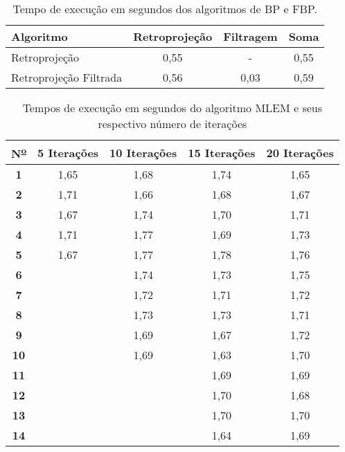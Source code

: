 \begin{table}[H]
	\footnotesize
	\centering
	\caption{Tempo de execução em segundos dos algoritmos de \acs{BP} e \acs{FBP}.}
	\label{tab:tabCap5Tempos1}
	\begin{tabular}{l|c|c|c}
		\textbf{Algoritmo}	    & \textbf{Retroprojeção} 	& \textbf{Filtragem} 	& \textbf{Soma}	\\ [5pt]
		\hline
		\hline
		Retroprojeção 	 		& 0,55						& -						& 0,55			\\ 
		\hline
		Retroprojeção Filtrada	& 0,56 						& 0,03					& 0,59			\\
		\hline
	\end{tabular}
	\vspace{2ex}
\end{table}

\begin{table}[H]
	\footnotesize
	\centering
	\caption{Tempos de execução em segundos do algoritmo \acs{MLEM} e seus respectivo número de iterações}
	\label{tab:tabCap5Tempos2}
	\begin{tabular}{c|c|c|c|c}
		\textbf{N\textsuperscript{\underline{o}}}&\textbf{5 Iterações}& \textbf{10 Iterações}& \textbf{15  Iterações}& \textbf{20 Iterações} 	\\ [5pt]
		\hline
		\hline
		\textbf{1 }&1,65 & 1,68 & 1,74 & 1,65 \\
		\hline
		\textbf{2 }&1,71 & 1,66 & 1,68 & 1,67 \\
		\hline
		\textbf{3 }&1,67 & 1,74 & 1,70 & 1,71 \\
		\hline
		\textbf{4 }&1,71 & 1,77 & 1,69 & 1,73 \\
		\hline
		\textbf{5 }&1,67 & 1,77 & 1,78 & 1,76 \\
		\hline
		\textbf{6 }&     & 1,74 & 1,73 & 1,75 \\
		\hline
		\textbf{7 }&     & 1,72 & 1,71 & 1,72 \\
		\hline
		\textbf{8 }&     & 1,73 & 1,73 & 1,71 \\
		\hline
		\textbf{9 }&     & 1,69 & 1,67 & 1,72 \\
		\hline
		\textbf{10}&     & 1,69 & 1,63 & 1,70 \\
		\hline
		\textbf{11}&     &      & 1,69 & 1,69 \\
		\hline
		\textbf{12}&     &      & 1,70 & 1,68 \\
		\hline
		\textbf{13}&     &      & 1,70 & 1,70 \\
		\hline
		\textbf{14}&     &      & 1,64 & 1,69 \\

\end{tabular}
\end{table}
